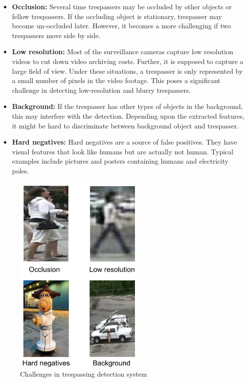 \begin{itemize}
    \item \textbf{Occlusion:} Several time trespassers may be occluded by other objects or fellow trespassers. If the occluding object is stationary, trespasser may become un-occluded later. However, it becomes a more challenging if two trespassers move side by side.  
    
    \item \textbf{Low resolution:} Most of the surveillance cameras capture low resolution videos to cut down video archiving costs. Further, it is supposed to capture a large field of view. Under these situations, a trespasser is only represented by a small number of pixels in the video footage. This poses a significant challenge in detecting low-resolution and blurry trespassers.
    
    \item \textbf{Background:} If the trespasser has other types of objects in the background, this may interfere with the detection. Depending upon the extracted features, it might be hard to discriminate between background object and trespasser. 
    
    
    \item \textbf{Hard negatives:} Hard negatives are a source of false positives. They have visual features that look like humans but are actually not human. Typical examples include pictures and posters containing humans and electricity poles. 
    
\end{itemize}

\begin{figure}
    \centering
    \includegraphics[height=10cm]{images/challenges.PNG}
    \caption{Challenges in trespassing detection system}
    \label{fig:challenges}
\end{figure}



